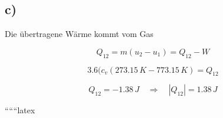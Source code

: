 

\subsection*{c)}
Die übertragene Wärme kommt vom Gas

\[
Q_{12} = m (u_2 - u_1) = Q_{12} - W
\]

\[
3.6 (c_v (273.15\,K - 773.15\,K) = Q_{12}
\]

\[
Q_{12} = -1.38\,J \quad \Rightarrow \quad |Q_{12}| = 1.38\,J
\]

``````latex